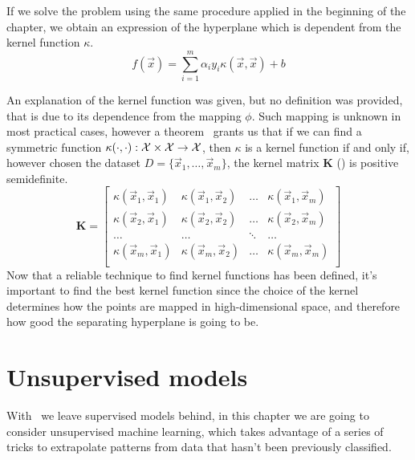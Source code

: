If we solve the problem using the same procedure applied in the beginning of the chapter, we obtain
an expression of the hyperplane which is dependent from the kernel function $\kappa$.
\begin{equation}
	\label{eq:hd-of}
	f(\vec{x}) = \sum_{i = 1}^m\alpha_iy_i\kappa(\vec{x}, \vec{x}) + b
\end{equation}

An explanation of the kernel function was given, but no definition was provided, that is due to its
dependence from the mapping $\phi$. Such mapping is unknown in most practical cases, however a
theorem~\cite{learning-with-kernels} grants us that if we can find a symmetric function
$\kappa(\cdot, \cdot): \mathcal{X} \times \mathcal{X} \rightarrow \mathcal{X}$, then $\kappa$ is a kernel function if and
only if, however chosen the dataset $D = \{\vec{x}_1, \ldots, \vec{x}_m\}$, the kernel matrix
$\mathbf{K}$ () is positive semidefinite.
\begin{equation}
	\label{eq:kernel-matrix}
	\mathbf{K} =
	\begin{bmatrix}
		\kappa(\vec{x}_1, \vec{x}_1) & \kappa(\vec{x}_1, \vec{x}_2) & \ldots &
		\kappa(\vec{x}_1, \vec{x}_m)                                                  \\
		\kappa(\vec{x}_2, \vec{x}_1) & \kappa(\vec{x}_2, \vec{x}_2) & \ldots &
		\kappa(\vec{x}_2, \vec{x}_m)                                                  \\
		\ldots                       & \ldots                       & \ddots & \ldots \\
		\kappa(\vec{x}_m, \vec{x}_1) & \kappa(\vec{x}_m, \vec{x}_2) & \ldots &
		\kappa(\vec{x}_m, \vec{x}_m)                                                  \\
	\end{bmatrix}
\end{equation}
Now that a reliable technique to find kernel functions has been defined, it's important to find the
best kernel function since the choice of the kernel determines how the points are mapped in
high-dimensional space, and therefore how good the separating hyperplane is going to be.

\section{Unsupervised models}
\label{sec:uml}
With \svms\ we leave supervised models behind, in this chapter we are going to consider unsupervised
machine learning, which takes advantage of a series of tricks to extrapolate patterns from data that
hasn't been previously classified.


